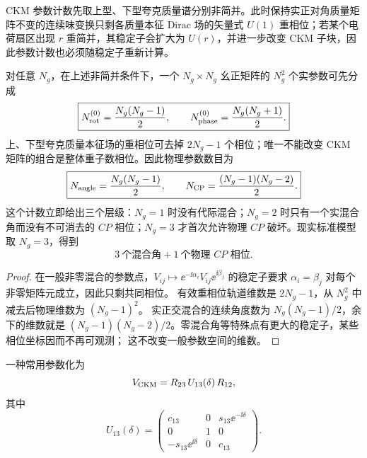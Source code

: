 \begin{proposition}[一般世代数的混合参数]
CKM 参数计数先取上型、下型夸克质量谱分别非简并。此时保持实正对角质量矩阵不变的连续味变换只剩各质量本征 Dirac 场的矢量式 $U(1)$ 重相位；若某个电荷扇区出现 $r$ 重简并，其稳定子会扩大为 $U(r)$，并进一步改变 CKM 子块，因此参数计数也必须随稳定子重新计算。

对任意 $N_g$，在上述非简并条件下，一个 $N_g\times N_g$ 幺正矩阵的 $N_g^2$ 个实参数可先分成
\begin{equation}
\boxed{
 N_{\rm rot}^{(0)}=\frac{N_g(N_g-1)}2,
 \qquad
 N_{\rm phase}^{(0)}=\frac{N_g(N_g+1)}2.}
\label{eq:unitary-matrix-parameter-split-dp68}
\end{equation}
上、下型夸克质量本征场的重相位可去掉 $2N_g-1$ 个相位；唯一不能改变 CKM 矩阵的组合是整体重子数相位。因此物理参数数目为
\begin{equation}
 \boxed{
 N_{\rm angle}=\frac{N_g(N_g-1)}2,
 \qquad
 N_{\rm CP}=\frac{(N_g-1)(N_g-2)}2.}
 \label{eq:ckm-general-parameter-count-dp14}
\end{equation}
这个计数立即给出三个层级：$N_g=1$ 时没有代际混合；$N_g=2$ 时只有一个实混合角而没有不可消去的 $CP$ 相位；$N_g=3$ 才首次允许物理 $CP$ 破坏。现实标准模型取 $N_g=3$，得到
\begin{equation*}
 3\ \text{个混合角}+1\ \text{个物理 $CP$ 相位}.
\end{equation*}
\end{proposition}

\begin{proof}
在一般非零混合的参数点，$V_{ij}\mapsto\ee^{-\ii\alpha_i}V_{ij}\ee^{\ii\beta_j}$
的稳定子要求 $\alpha_i=\beta_j$ 对每个非零矩阵元成立，因此只剩共同相位。
有效重相位轨道维数是 $2N_g-1$，从 $N_g^2$ 中减去后物理维数为 $(N_g-1)^2$。
实正交混合的连续角度数为 $N_g(N_g-1)/2$，余下的维数就是
$(N_g-1)(N_g-2)/2$。零混合角等特殊点有更大的稳定子，某些相位坐标因而不再可观测；
这不改变一般参数空间的维数。
\end{proof}

\begin{definition}[三代标准参数化]
一种常用参数化为
\begin{equation*}
 V_{\rm CKM}=R_{23}\,U_{13}(\delta)\,R_{12},
\end{equation*}
其中
\begin{equation*}
 U_{13}(\delta)=
 \begin{pmatrix}
 c_{13}&0&s_{13}\ee^{-\ii\delta}\\
 0&1&0\\
 -s_{13}\ee^{\ii\delta}&0&c_{13}
 \end{pmatrix}.
\end{equation*}
\end{definition}

